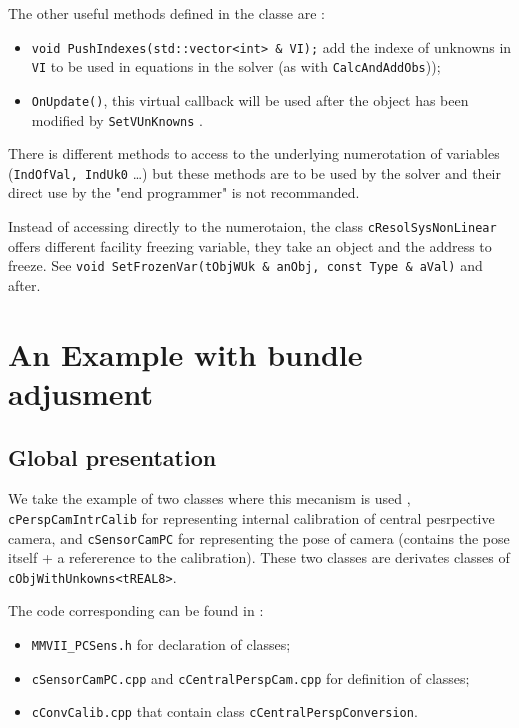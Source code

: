 The other useful methods defined in the classe are :

\begin{itemize}
   \item    {\tt void PushIndexes(std::vector<int> \& VI);}  add the indexe of unknowns in  {\tt VI}
            to be used in equations in the solver (as with {\tt CalcAndAddObs}));

   \item    {\tt OnUpdate()}, this virtual callback will be used after the object has been
            modified by   {\tt SetVUnKnowns} .

\end{itemize}

There is different methods to access to the underlying numerotation of variables
({\tt IndOfVal, IndUk0} \dots) but these methods are to be used by the solver and their
direct use by the "end programmer" is not recommanded.

Instead of accessing directly to the numerotaion, the class {\tt cResolSysNonLinear}
 offers different facility freezing variable, they  take an object and the address to freeze.
See {\tt void SetFrozenVar(tObjWUk \& anObj, const Type \& aVal)} and after.


\section{An Example  with bundle adjusment}

\subsection{Global presentation}

We take the example of two classes where this mecanism is used ,
{\tt cPerspCamIntrCalib} for representing internal calibration of central pesrpective
camera, and {\tt cSensorCamPC}  for representing the pose of camera (contains
the pose itself + a refererence to the calibration).
These two classes are derivates classes of {\tt cObjWithUnkowns<tREAL8>}.

The code corresponding can be found in :

\begin{itemize}
   \item {\tt MMVII\_PCSens.h} for declaration of classes;

   \item {\tt cSensorCamPC.cpp}  and {\tt cCentralPerspCam.cpp} for definition of classes;

   \item {\tt cConvCalib.cpp}  that contain  class {\tt cCentralPerspConversion}.
\end{itemize}


